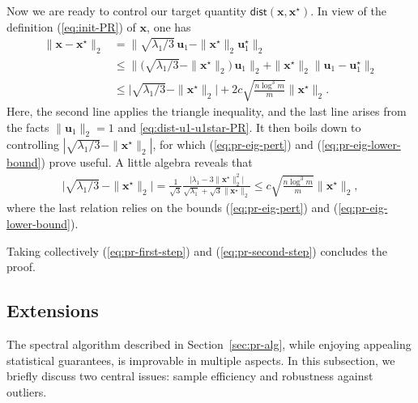 Now we are ready to control our target quantity $\mathsf{dist}(\bm{x},\bm{x}^{\star})$.
In view of the definition (\ref{eq:init-PR}) of $\bm{x}$, one has
%
\begin{align}
\|\bm{x}-\bm{x}^{\star}\|_{2}
 & = \Big\| \sqrt{\lambda_{1}/3}\,\bm{u}_{1}-\|\bm{x}^{\star}\|_{2}\bm{u}_{1}^{\star} \Big\|_{2}\nonumber \\
 & \leq \Big\| \Big(\sqrt{\lambda_{1}/3}-\|\bm{x}^{\star}\|_{2} \Big)\,\bm{u}_{1} \Big\|_{2}+\|\bm{x}^{\star}\|_{2}\|\bm{u}_{1}-\bm{u}_{1}^{\star}\|_{2}\nonumber \\
 & \leq \Big|\sqrt{\lambda_{1}/3}-\|\bm{x}^{\star}\|_{2} \Big| + 2c \sqrt{\frac{n\log^3 m}{m}}\|\bm{x}^{\star}\|_{2}.\label{eq:pr-first-step}
\end{align}
%
Here, the second line applies the triangle inequality, and the last line
arises from the facts $\|\bm{u}_{1}\|_{2}=1$ and 
\eqref{eq:dist-u1-u1star-PR}. %
It then boils down to controlling $|\sqrt{\lambda_{1}/3}-\|\bm{x}^{\star}\|_{2}|$,
for which (\ref{eq:pr-eig-pert}) and (\ref{eq:pr-eig-lower-bound})
prove useful. A little algebra reveals that
%
\begin{align}
	\Big|\sqrt{\lambda_{1}/3}\,-\|\bm{x}^{\star}\|_{2} \Big|
	=\frac{1}{\sqrt{3}}\frac{\big|\lambda_{1}-3\|\bm{x}^{\star}\|_{2}^{2} \big|}{\sqrt{\lambda_{1}}+\sqrt{3}\|\bm{x}^{\star}\|_{2}}
	\leq c\sqrt{\frac{n\log^3 m}{m}}\|\bm{x}^{\star}\|_{2},
	\label{eq:pr-second-step}
\end{align}
%
where the last relation relies on the bounds (\ref{eq:pr-eig-pert})
and (\ref{eq:pr-eig-lower-bound}).


Taking collectively (\ref{eq:pr-first-step}) and (\ref{eq:pr-second-step})
concludes the proof.





\subsection{Extensions}
\label{sec:improved-spectral-truncated}




The spectral algorithm described in Section~\ref{sec:pr-alg}, while enjoying appealing statistical guarantees, is improvable in multiple aspects.
In this subsection, we briefly discuss two central issues:  sample efficiency and robustness against outliers.



